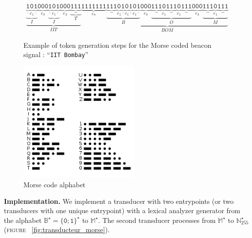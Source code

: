 \documentclass[twocolumn,pre,floats,aps,amsmath,amssymb]{revtex4}
\begin{document}
\begin{figure}[]
  \begin{eqnarray*}
    \underbrace{\underbrace{\underbrace{\texttt{1}}_{.} \underbrace{\texttt{0}}_{\varepsilon_1} \underbrace{\texttt{1}}_{.}}_{I} \underbrace{\texttt{000}}_{\varepsilon_3} \underbrace{\underbrace{\texttt{1}}_{.} \underbrace{\texttt{0}}_{\varepsilon_1} \underbrace{\texttt{1}}_{.}}_{I} \underbrace{\texttt{000}}_{\varepsilon_3} \underbrace{\underbrace{\texttt{111}}_{-}}_{T}}_{IIT}
    \underbrace{\texttt{1111111}}_{\varepsilon_7}
    \underbrace{\underbrace{\underbrace{\texttt{111}}_{-} \underbrace{\texttt{0}}_{\varepsilon_1} \underbrace{\texttt{1}}_{.} \underbrace{\texttt{0}}_{\varepsilon_1} \underbrace{\texttt{1}}_{.} \underbrace{\texttt{0}}_{\varepsilon_1} \underbrace{\texttt{1}}_{.}}_{B} \underbrace{\texttt{000}}_{\varepsilon_3} \underbrace{\underbrace{\texttt{111}}_{-} \underbrace{\texttt{0}}_{\varepsilon_1} \underbrace{\texttt{111}}_{-} \underbrace{\texttt{0}}_{\varepsilon_1} \underbrace{\texttt{111}}_{-}}_{O} \underbrace{\texttt{000}}_{\varepsilon_3} \underbrace{\underbrace{\texttt{111}}_{-} \underbrace{\texttt{0}}_{\varepsilon_1} \underbrace{\texttt{111}}_{-}}_{M}}_{BOM}
  \end{eqnarray*}  
  \caption{Example of token generation steps for the Morse coded beacon signal : ``\texttt{IIT Bombay}''}
  \label{fig:exemple_signal_morse}
\end{figure}


\begin{figure}[h]
  \includegraphics[width=6cm]{pictures/morse.png}
\caption{Morse code alphabet}
\label{fig:morse}
\end{figure}

\textbf{Implementation.} We implement a transducer with two entrypoints (or two transducers with one unique entrypoint) with a lexical analyzer generator from the alphabet $\mathbb{B}^{\star} = \{ \texttt{0} ; \texttt{1} \}^{\star}$ to $\mathbb{M}^{\star}$. The second transducer processes from $\mathbb{M}^{\star}$ to $\mathbb{N}_{255}^{\star}$ (\textsc{figure} ~\ref{fig:transducteur_morse}).
\end{document}
